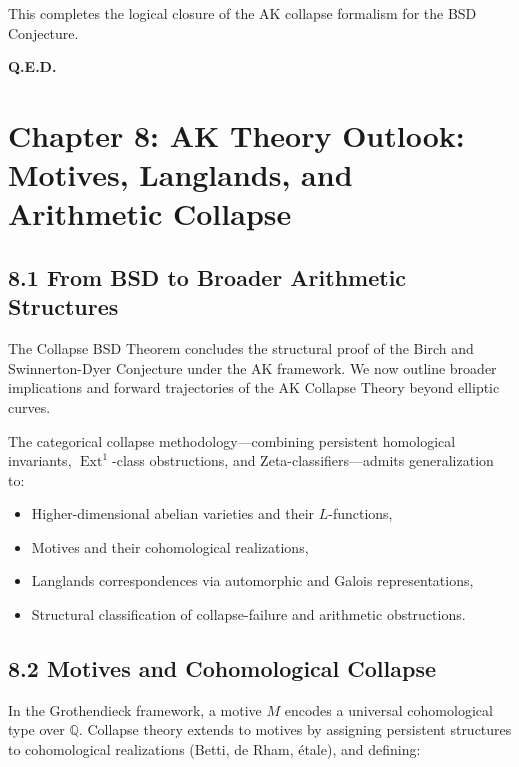 \documentclass[11pt]{article}
\DeclareMathOperator{\Ext}{Ext}
\begin{document}
This completes the logical closure of the AK collapse formalism for the BSD Conjecture.

\begin{flushright}
\textbf{Q.E.D.}
\end{flushright}




\section{Chapter 8: AK Theory Outlook: Motives, Langlands, and Arithmetic Collapse}

\subsection{8.1 From BSD to Broader Arithmetic Structures}

The Collapse BSD Theorem concludes the structural proof of the Birch and Swinnerton-Dyer Conjecture under the AK framework.  
We now outline broader implications and forward trajectories of the AK Collapse Theory beyond elliptic curves.

The categorical collapse methodology—combining persistent homological invariants, $\Ext^1$-class obstructions, and Zeta-classifiers—admits generalization to:

\begin{itemize}
  \item Higher-dimensional abelian varieties and their $L$-functions,
  \item Motives and their cohomological realizations,
  \item Langlands correspondences via automorphic and Galois representations,
  \item Structural classification of collapse-failure and arithmetic obstructions.
\end{itemize}

\subsection{8.2 Motives and Cohomological Collapse}

In the Grothendieck framework, a motive $M$ encodes a universal cohomological type over $\mathbb{Q}$.  
Collapse theory extends to motives by assigning persistent structures to cohomological realizations (Betti, de Rham, étale), and defining:
\end{document}
